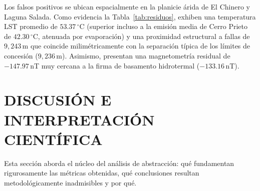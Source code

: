 \documentclass[10pt,twocolumn,letterpaper]{article}
\begin{document}
\begin{table}[htbp]
\centering
\caption{Firma geofísica media de falsos positivos frente a negativos y positivos reales (Red LeakyReLU).}
\label{tab:residuos}
\end{table}

Los falsos positivos se ubican espacialmente en la planicie árida de El Chinero y Laguna Salada. Como evidencia la Tabla~\ref{tab:residuos}, exhiben una temperatura LST promedio de $53.37\,^\circ\text{C}$ (superior incluso a la emisión media de Cerro Prieto de $42.30\,^\circ\text{C}$, atenuada por evaporación) y una proximidad estructural a fallas de $9{,}243$\,m que coincide milimétricamente con la separación típica de los límites de concesión ($9{,}236$\,m). Asimismo, presentan una magnetometría residual de $-147.97$\,nT muy cercana a la firma de basamento hidrotermal ($-133.16$\,nT).

\section{DISCUSIÓN E INTERPRETACIÓN CIENTÍFICA}

Esta sección aborda el núcleo del análisis de abstracción: qué fundamentan rigurosamente las métricas obtenidas, qué conclusiones resultan metodológicamente inadmisibles y por qué.
\end{document}
